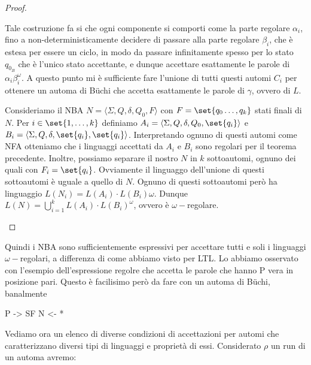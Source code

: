 \begin{proof}
\begin{description}
      Tale costruzione fa si che ogni componente si comporti come la parte regolare \(\alpha_i\), fino a non-deterministicamente decidere di passare alla parte regolare \(\beta_i\), che è estesa per essere un ciclo, in modo da passare infinitamente spesso per lo stato \(q_{0_B}\) che è l'unico stato accettante, e dunque accettare esattamente le parole di \(\alpha_i\beta_i^\omega\). A questo punto mi è sufficiente fare l'unione di tutti questi automi \(C_i\) per ottenere un automa di Büchi che accetta esattamente le parole di \(\gamma\), ovvero di \(L\).
    \item[(\(\impliedby\))] Consideriamo il NBA \(N = \langle \Sigma, Q, \delta, Q_0, F\rangle\) con \(F = \set{q_0\ldots,q_k}\) stati finali di \(N\). Per \(i \in \set{1,\ldots,k}\) definiamo \(A_i = \langle \Sigma, Q, \delta, Q_0, \set{q_i}\rangle\) e \(B_i = \langle \Sigma, Q, \delta, \set{q_i}, \set{q_i}\rangle\). Interpretando ognuno di questi automi come NFA otteniamo che i linguaggi accettati da \(A_i\) e \(B_i\) sono regolari per il teorema precedente. Inoltre, possiamo separare il nostro \(N\) in \(k\) sottoautomi, ognuno dei quali con \(F_i = \set{q_i}\). Ovviamente il linguaggo dell'unione di questi sottoautomi è uguale a quello di \(N\). Ognuno di questi sottoautomi però ha linguaggio \(L(N_i) = L(A_i)\cdot L(B_i)\omega\). Dunque \(L(N) = \bigcup_{i=1}^k L(A_i)\cdot {L(B_i)}^\omega\), ovvero è \(\omega-\)regolare.
  \end{description}
\end{proof}

Quindi i NBA sono sufficientemente espressivi per accettare tutti e soli i linguaggi \(\omega-\)regolari, a differenza di come abbiamo visto per LTL. Lo abbiamo osservato con l'esempio dell'espressione regolre  che accetta le parole che hanno P vera in posizione pari. Questo è facilisimo però da fare con un automa di Büchi, banalmente

P
->
SF  N
<-
*

Vediamo ora un elenco di diverse condizioni di accettazioni per automi che caratterizzano diversi tipi di linguaggi e proprietà di essi. Considerato \(\rho\) un run di un automa avremo:

